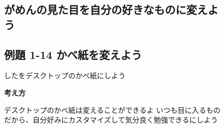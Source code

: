 \begin{figure}
  \subsection{がめんの見た目を自分の好きなものに変えよう}
  
  \subsection{例題 1-14 かべ紙を変えよう}
  したをデスクトップのかべ紙にしよう

  \textbf{考え方}
  \bigskip

  \centering
  \begin{minipage}{\textwidth}
    デスクトップのかべ紙は変えることができるよ
    いつも目に入るものだから、自分好みにカスタマイズして気分良く勉強できるにしよう
  \end{minipage}


\end{figure}

